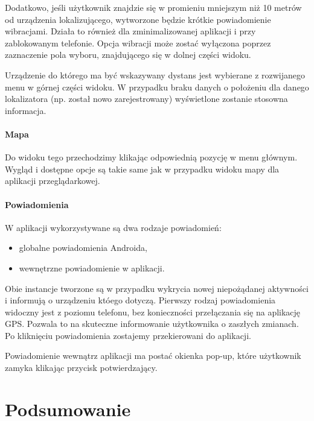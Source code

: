 \documentclass[eng,printmode]{mgr}
\begin{document}
Dodatkowo, jeśli użytkownik znajdzie się w promieniu mniejszym niż 10 metrów od urządzenia lokalizującego, wytworzone będzie krótkie powiadomienie wibracjami. Działa to również dla zminimalizowanej aplikacji i przy zablokowanym telefonie. Opcja wibracji może zostać wyłączona poprzez zaznaczenie pola wyboru, znajdującego się w dolnej części widoku.

Urządzenie do którego ma być wskazywany dystans jest wybierane z rozwijanego menu w górnej części widoku. W przypadku braku danych o położeniu dla danego lokalizatora (np. został nowo zarejestrowany) wyświetlone zostanie stosowna informacja.

\subsubsection{Mapa}
Do widoku tego przechodzimy klikając odpowiednią pozycję w menu głównym. Wygląd i dostępne opcje są takie same jak w przypadku widoku mapy dla aplikacji przeglądarkowej.

\subsubsection{Powiadomienia}
W aplikacji wykorzystywane są dwa rodzaje powiadomień:
\begin{itemize}
\item globalne powiadomienia Androida,
\item wewnętrzne powiadomienie w aplikacji.
\end{itemize}

Obie instancje tworzone są w przypadku wykrycia nowej niepożądanej aktywności i informują o urządzeniu któego dotyczą. Pierwszy rodzaj powiadomienia widoczny jest z poziomu telefonu, bez konieczności przełączania się na aplikację GPS. Pozwala to na skuteczne informowanie użytkownika o zaszłych zmianach. Po kliknięciu powiadomienia zostajemy przekierowani do aplikacji.

Powiadomienie wewnątrz aplikacji ma postać okienka pop-up, które użytkownik zamyka klikając przycisk potwierdzający.





\chapter{Podsumowanie}

 
\end{document}

